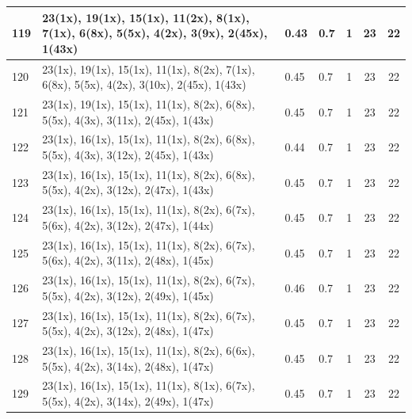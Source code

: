 \begin{small}
\begin{longtable}{|p{0.5cm}|p{9cm}|p{1.3cm}|p{1.3cm}|c|c|c|}
  119 & 23(1x), 19(1x), 15(1x), 11(2x), 8(1x), 7(1x), 6(8x), 5(5x), 4(2x), 3(9x), 2(45x), 1(43x) & \cellcolor{colorGood}  0.43 & \cellcolor{colorGood} 0.7 & 1 & 23 & \cellcolor{colorBad} 22 \\   \hline
  120 & 23(1x), 19(1x), 15(1x), 11(1x), 8(2x), 7(1x), 6(8x), 5(5x), 4(2x), 3(10x), 2(45x), 1(43x) & \cellcolor{colorGood}  0.45 & \cellcolor{colorGood} 0.7 & 1 & 23 & \cellcolor{colorBad} 22 \\   \hline
  121 & 23(1x), 19(1x), 15(1x), 11(1x), 8(2x), 6(8x), 5(5x), 4(3x), 3(11x), 2(45x), 1(43x) & \cellcolor{colorGood}  0.45 & \cellcolor{colorGood} 0.7 & 1 & 23 & \cellcolor{colorBad} 22 \\   \hline
  122 & 23(1x), 16(1x), 15(1x), 11(1x), 8(2x), 6(8x), 5(5x), 4(3x), 3(12x), 2(45x), 1(43x) & \cellcolor{colorGood}  0.44 & \cellcolor{colorGood} 0.7 & 1 & 23 & \cellcolor{colorBad} 22 \\   \hline
  123 & 23(1x), 16(1x), 15(1x), 11(1x), 8(2x), 6(8x), 5(5x), 4(2x), 3(12x), 2(47x), 1(43x) & \cellcolor{colorGood}  0.45 & \cellcolor{colorGood} 0.7 & 1 & 23 & \cellcolor{colorBad} 22 \\   \hline
  124 & 23(1x), 16(1x), 15(1x), 11(1x), 8(2x), 6(7x), 5(6x), 4(2x), 3(12x), 2(47x), 1(44x) & \cellcolor{colorGood}  0.45 & \cellcolor{colorGood} 0.7 & 1 & 23 & \cellcolor{colorBad} 22 \\   \hline
  125 & 23(1x), 16(1x), 15(1x), 11(1x), 8(2x), 6(7x), 5(6x), 4(2x), 3(11x), 2(48x), 1(45x) & \cellcolor{colorGood}  0.45 & \cellcolor{colorGood} 0.7 & 1 & 23 & \cellcolor{colorBad} 22 \\   \hline
  126 & 23(1x), 16(1x), 15(1x), 11(1x), 8(2x), 6(7x), 5(5x), 4(2x), 3(12x), 2(49x), 1(45x) & \cellcolor{colorGood}  0.46 & \cellcolor{colorGood} 0.7 & 1 & 23 & \cellcolor{colorBad} 22 \\   \hline
  127 & 23(1x), 16(1x), 15(1x), 11(1x), 8(2x), 6(7x), 5(5x), 4(2x), 3(12x), 2(48x), 1(47x) & \cellcolor{colorGood}  0.45 & \cellcolor{colorGood} 0.7 & 1 & 23 & \cellcolor{colorBad} 22 \\   \hline
  128 & 23(1x), 16(1x), 15(1x), 11(1x), 8(2x), 6(6x), 5(5x), 4(2x), 3(14x), 2(48x), 1(47x) & \cellcolor{colorGood}  0.45 & \cellcolor{colorGood} 0.7 & 1 & 23 & \cellcolor{colorBad} 22 \\   \hline
  129 & 23(1x), 16(1x), 15(1x), 11(1x), 8(1x), 6(7x), 5(5x), 4(2x), 3(14x), 2(49x), 1(47x) & \cellcolor{colorGood}  0.45 & \cellcolor{colorGood} 0.7 & 1 & 23 & \cellcolor{colorBad} 22 \\   \hline

\end{longtable}
\end{small}
